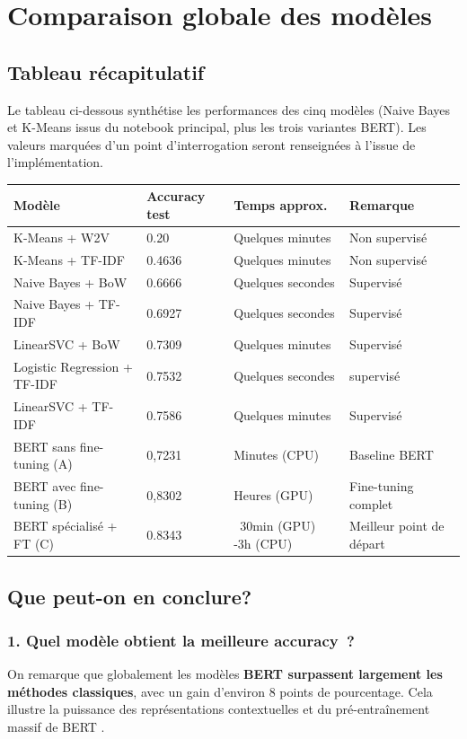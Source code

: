 \documentclass[12pt,a4paper]{report}
\begin{document}
\section{Comparaison globale des modèles}

\subsection{Tableau récapitulatif}

Le tableau ci-dessous synthétise les performances des cinq modèles (Naive Bayes
et K-Means issus du notebook principal, plus les trois variantes BERT). Les valeurs
marquées d'un point d'interrogation seront renseignées à l'issue de l'implémentation.

\begin{center}
\begin{tabular}{@{}L{4cm}C{2.5cm}C{3cm}L{3.5cm}@{}}
  \toprule
  Modèle & Accuracy test & Temps approx. & Remarque \\
  \midrule
  K-Means + W2V & 0.20 & Quelques minutes & Non supervisé \\
  K-Means + TF-IDF & 0.4636 & Quelques minutes & Non supervisé \\
  Naive Bayes + BoW & 0.6666 & Quelques secondes & Supervisé \\
  Naive Bayes + TF-IDF & 0.6927 & Quelques secondes & Supervisé \\
  LinearSVC + BoW & 0.7309 & Quelques minutes & Supervisé \\
  Logistic Regression + TF-IDF & 0.7532 & Quelques secondes & supervisé \\
  LinearSVC + TF-IDF & 0.7586 & Quelques minutes & Supervisé \\
  \midrule
  BERT sans fine-tuning (A) & 0,7231 & Minutes (CPU) & Baseline BERT \\
  BERT avec fine-tuning (B) & 0,8302 & Heures (GPU) & Fine-tuning complet \\
  BERT spécialisé + FT (C) & 0.8343 & ~30min (GPU) -3h (CPU) & Meilleur point de départ \\
  \bottomrule
\end{tabular}
\end{center}


\subsection{Que peut-on en conclure?}

\subsubsection{1. Quel modèle obtient la meilleure accuracy~?}
On remarque que globalement les modèles \textbf{BERT surpassent largement les méthodes classiques}, 
avec un gain d'environ 8 points de pourcentage. Cela illustre la puissance des représentations 
contextuelles et du pré-entraînement massif de BERT .
\end{document}
